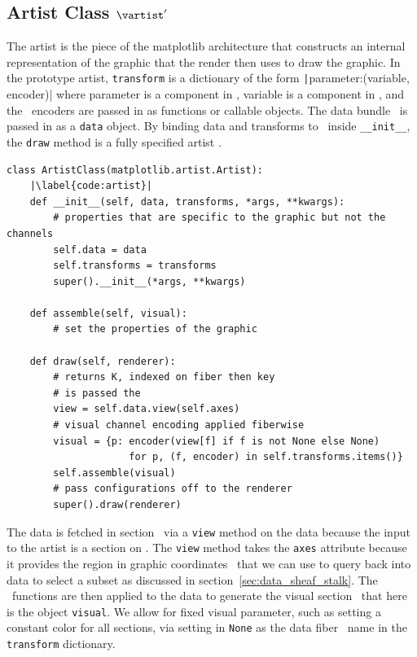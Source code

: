 \documentclass[../main.tex]{subfiles}
\begin{document}
\subsection{Artist Class $\vartist^{\prime}$}
\label{sec:code_artist}
The artist is the piece of the matplotlib architecture that constructs an internal representation of the graphic that the render then uses to draw the graphic. In the prototype artist, \texttt{transform} is a dictionary of the form \texttt|{parameter:(variable, encoder)}| where parameter is a component in \vfiber, variable is a component in \dfiber,  and the \vchannel\ encoders are passed in as functions or callable objects. The data bundle \dtotal\ is passed in as a \texttt{data} object. By binding data and transforms to \vartisteq\ inside \texttt{__init__}, the \texttt{draw} method is a fully specified artist \vartist.

\begin{verbatim}
class ArtistClass(matplotlib.artist.Artist):
    |\label{code:artist}|
    def __init__(self, data, transforms, *args, **kwargs):
        # properties that are specific to the graphic but not the channels
        self.data = data 
        self.transforms = transforms
        super().__init__(*args, **kwargs)

    def assemble(self, visual):
        # set the properties of the graphic

    def draw(self, renderer):
        # returns K, indexed on fiber then key 
        # is passed the 
        view = self.data.view(self.axes) 
        # visual channel encoding applied fiberwise 
        visual = {p: encoder(view[f] if f is not None else None) 
                     for p, (f, encoder) in self.transforms.items()}
        self.assemble(visual)
        # pass configurations off to the renderer
        super().draw(renderer)
\end{verbatim}

The data is fetched in section \dsection\ via a \texttt{view} method on the data because the input to the artist is a section on \dtotal. The \texttt{view} method takes the \texttt{axes} attribute because it provides the region in graphic coordinates \gbase\ that we can use to query back into data to select a subset as discussed in section~\ref{sec:data_sheaf_stalk}. The \vchannel\ functions are then applied to the data to generate the visual section \vsection\ that here is the object \texttt{visual}. We allow for fixed visual parameter, such as setting a constant color for all sections, via setting in \texttt{None} as the data fiber \dfiber\ name in the \texttt{transform} dictionary. 
\end{document}
